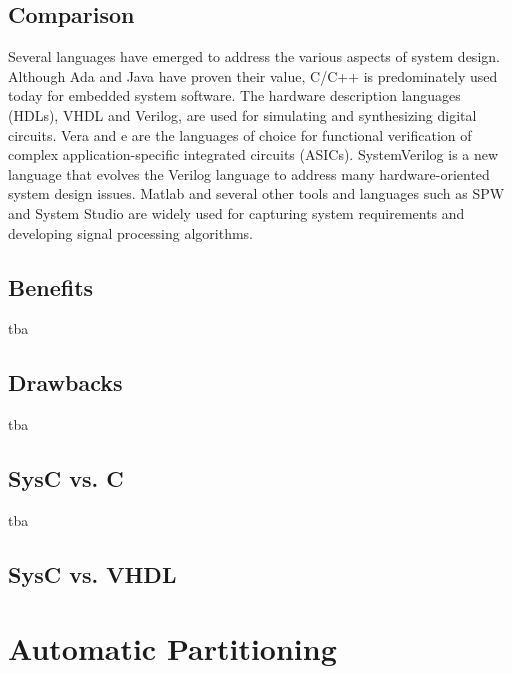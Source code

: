 \documentclass{article}
\begin{document}
		\subsection{Comparison}
		Several languages have emerged to address the various aspects of system design. Although Ada and Java have proven their value, C/C++ is predominately used today for embedded system software. The hardware description languages (HDLs), VHDL and Verilog, are used for simulating and synthesizing digital circuits. Vera and e are the languages of choice for functional verification of complex application-specific integrated circuits (ASICs). SystemVerilog is a new language that evolves the Verilog language to address many hardware-oriented system design issues. Matlab and several other tools and languages such as SPW and System Studio are widely used for capturing system requirements and developing signal processing algorithms.
		
	  \subsection{Benefits}
	  
	  tba
	  
	  \subsection{Drawbacks}
	  
	  tba
	  
	  \subsection{SysC vs. C}
	  
	  tba
	  
	  \subsection{SysC vs. VHDL}

	\section{Automatic Partitioning}
\end{document}
